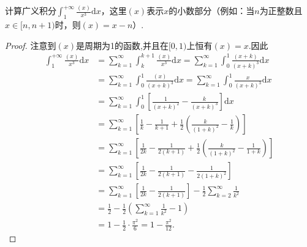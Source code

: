\documentclass[../../main.tex]{subfiles}%
\begin{document}
\begin{example}
计算广义积分$\int_{1}^{+\infty} \frac{(x)}{x^3} \mathrm{d}x$，这里$(x)$表示$x$的小数部分（例如：当$n$为正整数且$x \in [n, n+1)$时，则$(x) = x - n$）.
\end{example}
\begin{proof}

注意到$(x)$是周期为1的函数,并且在$[0,1)$上恒有$(x)=x$.因此
\begin{align*}
\int_1^{+\infty}{\frac{\left( x \right)}{x^3}\mathrm{d}x}&=\sum\limits_{k=1}^{\infty}{\int_k^{k+1}{\frac{\left( x \right)}{x^3}\mathrm{d}x}}=\sum\limits_{k=1}^{\infty}{\int_0^1{\frac{\left( x+k \right)}{\left( x+k \right) ^3}\mathrm{d}x}}
\\
&=\sum\limits_{k=1}^{\infty}{\int_0^1{\frac{\left( x \right)}{\left( x+k \right) ^3}\mathrm{d}x}}=\sum\limits_{k=1}^{\infty}{\int_0^1{\frac{x}{\left( x+k \right) ^3}\mathrm{d}x}}
\\
&=\sum\limits_{k=1}^{\infty}{\int_0^1{\left[ \frac{1}{\left( x+k \right) ^2}-\frac{k}{\left( x+k \right) ^3} \right] \mathrm{d}x}}
\\
&=\sum\limits_{k=1}^{\infty}{\left[ \frac{1}{k}-\frac{1}{k+1}+\frac{1}{2}\left( \frac{k}{\left( 1+k \right) ^2}-\frac{1}{k} \right) \right]}
\\
&=\sum\limits_{k=1}^{\infty}{\left[ \frac{1}{2k}-\frac{1}{2\left( k+1 \right)}+\frac{1}{2}\left( \frac{k}{\left( 1+k \right) ^2}-\frac{1}{1+k} \right) \right]}
\\
&=\sum\limits_{k=1}^{\infty}{\left[ \frac{1}{2k}-\frac{1}{2\left( k+1 \right)}-\frac{1}{2\left( 1+k \right) ^2} \right]}
\\
&=\sum\limits_{k=1}^{\infty}{\left[ \frac{1}{2k}-\frac{1}{2\left( k+1 \right)} \right]}-\frac{1}{2}\sum\limits_{k=2}^{\infty}{\frac{1}{k ^2}}
\\
&=\frac{1}{2}-\frac{1}{2}\left( \sum\limits_{k=1}^{\infty}{\frac{1}{k ^2}}-1 \right) 
\\
&=1-\frac{1}{2}\cdot \frac{\pi ^2}{6}=1-\frac{\pi ^2}{12}.
\end{align*}

\end{proof}
\end{document}
